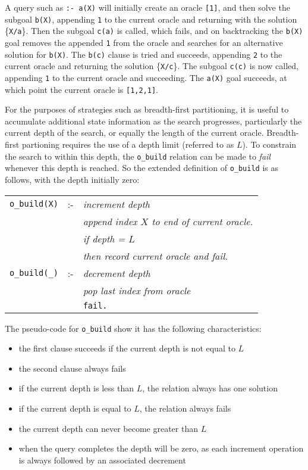 A query such as \texttt{:- a(X)} will initially create an oracle \texttt{[1]}, and then
solve the subgoal \texttt{b(X)}, appending \texttt{1} to the current oracle and returning
with the solution \{\texttt{X/a}\}.  Then the subgoal \texttt{c(a)} is called, which fails,
and on backtracking the \texttt{b(X)} goal removes the appended \texttt{1} from the oracle
and searches for an alternative solution for \texttt{b(X)}.  The \texttt{b(c)} clause is
tried and succeeds, appending \texttt{2} to the current oracle and returning the solution
\{\texttt{X/c}\}.  The subgoal \texttt{c(c)} is now called, appending \texttt{1} to the 
current oracle and succeeding.  The \texttt{a(X)} goal succeeds, at which point the current
oracle is \texttt{[1,2,1]}.

For the purposes of strategies such as breadth-first partitioning, it is useful to
accumulate additional state information as the search progresses, particularly the
current depth of the search, or equally the length of the current oracle.  Breadth-first
partioning requires the use of a depth limit (referred to as $L$).  To constrain the
search to within this depth, the \texttt{o\_{}build} relation can be made to \textit{fail}
whenever this depth is reached.  So the extended definition of \texttt{o\_{}build} is as
follows, with the depth initially zero:

\begin{tabular}{l l l}
\texttt{o\_{}build(X)}    & :- & \textit{increment depth}\\
                          &    & \textit{append index $X$ to end of current oracle.}\\
                          &    & \textit{if depth = $L$}\\
                          &    & \textit{then record current oracle and fail.}\\
\texttt{o\_{}build(\_{})} & :- & \textit{decrement depth}\\
                          &    & \textit{pop last index from oracle}\\
                          &    & \texttt{fail.}\\
\end{tabular}

The pseudo-code for \texttt{o\_{}build} show it has the following characteristics:
\begin{itemize}
\item{the first clause succeeds if the current depth is not equal to $L$}
\item{the second clause always fails}
\item{if the current depth is less than $L$, the relation always has one solution}
\item{if the current depth is equal to $L$, the relation always fails}
\item{the current depth can never become greater than $L$}
\item{when the query completes the depth will be zero, as each increment operation is
  always followed by an associated decrement}
\end{itemize}

